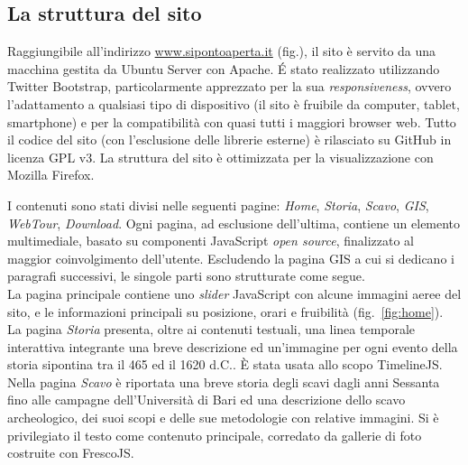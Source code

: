 \documentclass{paper}
\begin{document}
    \subsection{La struttura del sito}

        Raggiungibile all'indirizzo \url{www.sipontoaperta.it} (fig.), il sito è servito da una macchina gestita da Ubuntu Server con Apache. É stato realizzato utilizzando Twitter Bootstrap, particolarmente apprezzato per la sua \emph{responsiveness}, ovvero l'adattamento a qualsiasi tipo di dispositivo (il sito è fruibile da computer, tablet, smartphone) e per la compatibilità con quasi tutti i maggiori browser web. Tutto il codice del sito (con l'esclusione delle librerie esterne) è rilasciato su GitHub in licenza GPL v3. La struttura del sito è ottimizzata per la visualizzazione con Mozilla Firefox.

        I contenuti sono stati divisi nelle seguenti pagine: \emph{Home}, \emph{Storia}, \emph{Scavo}, \emph{GIS}, \emph{WebTour}, \emph{Download}. Ogni pagina, ad esclusione dell'ultima, contiene un elemento multimediale, basato su componenti JavaScript \textit{open source}, finalizzato al maggior coinvolgimento dell'utente. Escludendo la pagina GIS a cui si dedicano i paragrafi successivi, le singole parti sono strutturate come segue.\\

        La pagina principale contiene uno \textit{slider} JavaScript con alcune immagini aeree del sito, e le informazioni principali su posizione, orari e fruibilità (fig.~\ref{fig:home}).\\

        La pagina \emph{Storia} presenta, oltre ai contenuti testuali, una linea temporale interattiva integrante una breve descrizione ed un'immagine per ogni evento della storia sipontina tra il 465 ed il 1620 d.C.. È stata usata allo scopo TimelineJS.\\

        Nella pagina \emph{Scavo} è riportata una breve storia degli scavi dagli anni Sessanta fino alle campagne dell'Università di Bari ed una descrizione dello scavo archeologico, dei suoi scopi e delle sue metodologie con relative immagini. Si è privilegiato il testo come contenuto principale, corredato da gallerie di foto costruite con FrescoJS.\\
\end{document}
